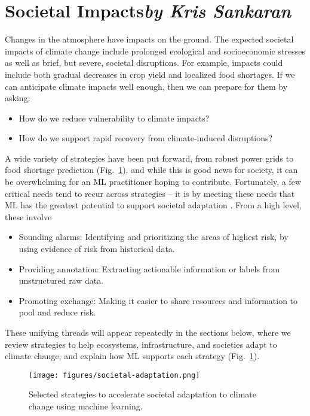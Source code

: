 \documentclass[11pt]{report}
\begin{document}
\section{Societal Impacts\texorpdfstring{\hfill\textit{by Kris Sankaran}}{}}
\label{sec:societal-impacts}

Changes in the atmosphere have impacts on the ground.
The expected societal impacts of climate change include prolonged ecological and
socioeconomic stresses as well as brief, but severe, societal disruptions. For example, impacts could include both gradual decreases in crop yield and localized food shortages.
If we can anticipate climate impacts well enough, then we can prepare for
them by asking:

\begin{itemize}
\item How do we reduce vulnerability to climate impacts?
\item How do we support rapid recovery from climate-induced disruptions?
\end{itemize}

A wide variety of strategies have been put forward, from robust power grids to
food shortage prediction (Fig.~\ref{fig:society}), and while this is good news for society, it can be
overwhelming for an ML practitioner hoping to contribute. Fortunately, a few
critical needs tend to recur across strategies -- it is by meeting
these needs that ML has the greatest potential to support societal adaptation
\cite{ford2016opinion, quinn2014computational, kelling2018computational}.
From a high level, these involve
\begin{itemize}
\item Sounding alarms: Identifying and prioritizing the areas of highest risk, by using evidence of risk from historical data.
\item Providing annotation: Extracting actionable information or labels from unstructured raw data.
\item Promoting exchange: Making it easier to share resources and information to pool and reduce risk.
\end{itemize}

These unifying threads will appear repeatedly in the sections below, where we review strategies to help ecosystems, infrastructure, and societies adapt to climate change, and explain how ML supports each strategy (Fig.~\ref{fig:society}).
\begin{figure}[hppt]
    \centering
    \texttt{[image: figures/societal-adaptation.png]}
    \caption{Selected strategies to accelerate societal adaptation to climate change using machine learning.}
    \label{fig:society}
\end{figure}
\end{document}
